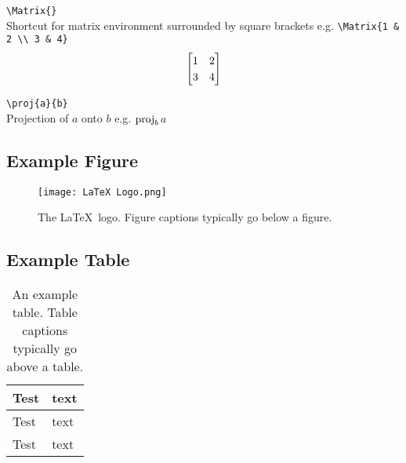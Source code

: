 \documentclass[a4paper, 12pt, english]{article}
\begin{document}
            \verb+\Matrix{}+\\
            Shortcut for matrix environment surrounded by square brackets e.g. \verb+\Matrix{1 & 2 \\ 3 & 4}+
            \begin{equation*}
                \Matrix{1 & 2 \\ 3 & 4}
            \end{equation*}

            \verb+\proj{a}{b}+\\
            Projection of $a$ onto $b$ e.g. $\proj{a}{b}$


        

    \newpage




    \newpage


    \appendices

        \subsection{Example Figure}
            \label{app: example figure}

            \begin{figure}[!h]
                \centering
                \texttt{[image: LaTeX Logo.png]}    

                \caption{The \LaTeX~logo. Figure captions typically go below a figure.}
                \label{fig: latex logo}
            \end{figure}

            \FloatBarrier

        \subsection{Example Table}
            \label{app: example table}

            \begin{table}[!h]
                \centering
                \caption{An example table. Table captions typically go above a table.}
                \label{table: example}
                \begin{tabular}{ |C{0.2\textwidth}|m{0.2\textwidth}| }
                    \hline
                    Test & text\\
                    \hline
                    \hline
                    Test & text\\
                    \hline
                    Test & text\\
                    \hline
                \end{tabular}
            \end{table}
\end{document}
